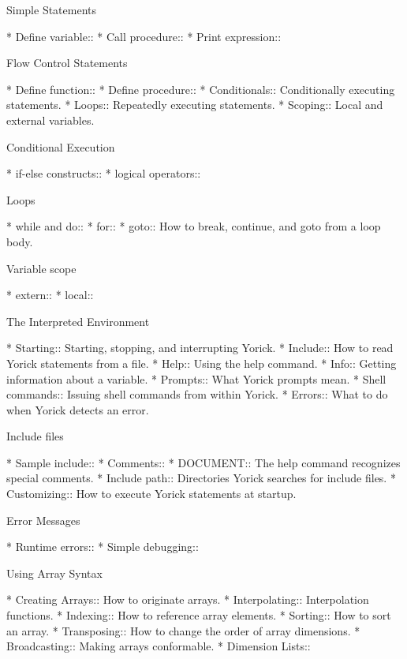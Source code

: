 Simple Statements

* Define variable::             
* Call procedure::              
* Print expression::            

Flow Control Statements

* Define function::             
* Define procedure::            
* Conditionals::                Conditionally executing statements.
* Loops::                       Repeatedly executing statements. 
* Scoping::                     Local and external variables.

Conditional Execution

* if-else constructs::          
* logical operators::           

Loops

* while and do::                
* for::                         
* goto::                        How to break, continue, and goto from a loop body.

Variable scope

* extern::                      
* local::                       

The Interpreted Environment

* Starting::                    Starting, stopping, and interrupting Yorick.
* Include::                     How to read Yorick statements from a file.
* Help::                        Using the help command.
* Info::                        Getting information about a variable.
* Prompts::                     What Yorick prompts mean.
* Shell commands::              Issuing shell commands from within Yorick.
* Errors::                      What to do when Yorick detects an error.

Include files

* Sample include::              
* Comments::                    
* DOCUMENT::                    The help command recognizes special comments.
* Include path::                Directories Yorick searches for include files.
* Customizing::                 How to execute Yorick statements at startup.

Error Messages

* Runtime errors::              
* Simple debugging::            

Using Array Syntax

* Creating Arrays::             How to originate arrays.
* Interpolating::               Interpolation functions.
* Indexing::                    How to reference array elements.
* Sorting::                     How to sort an array.
* Transposing::                 How to change the order of array dimensions.
* Broadcasting::                Making arrays conformable.
* Dimension Lists::             

